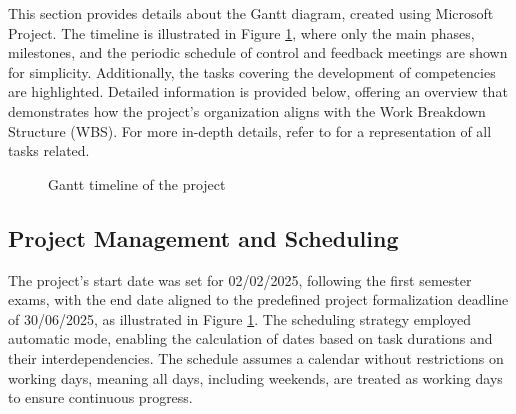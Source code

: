 This section provides details about the Gantt diagram, created using Microsoft Project. The timeline is illustrated in Figure \ref{fig:gantt_timeline}, where only the main phases, milestones, and the periodic schedule of control and feedback meetings are shown for simplicity. Additionally, the tasks covering the development of competencies are highlighted. Detailed information is provided below, offering an overview that demonstrates how the project’s organization aligns with the Work Breakdown Structure (WBS). For more in-depth details, refer to  for a representation of all tasks related.

\begin{figure}
      \centering
      \caption{Gantt timeline of the project}
      \label{fig:gantt_timeline}
\end{figure}


\subsection{Project Management and Scheduling}

The project’s start date was set for 02/02/2025, following the first semester exams, with the end date aligned to the predefined project formalization deadline of 30/06/2025, as illustrated in Figure \ref{fig:gantt_timeline}. The scheduling strategy employed automatic mode, enabling the calculation of dates based on task durations and their interdependencies. The schedule assumes a calendar without restrictions on working days, meaning all days, including weekends, are treated as working days to ensure continuous progress.

